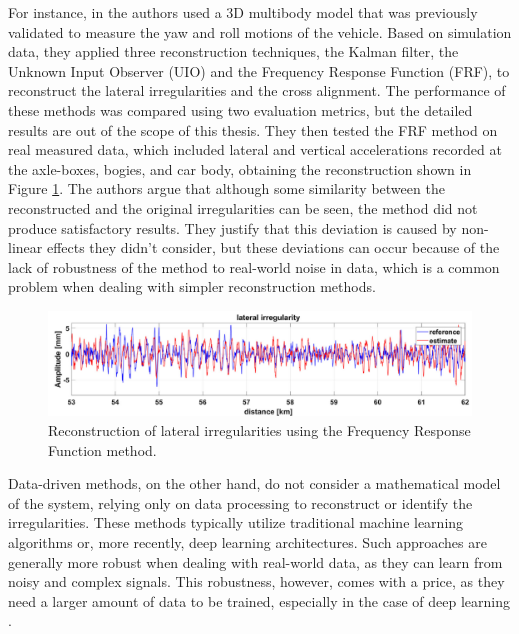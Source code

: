 For instance, in \cite{DEROSA2019606} the authors used a 3D multibody model that was previously validated to measure the yaw and roll motions of the vehicle. Based on simulation data, they applied three reconstruction techniques, the Kalman filter, the Unknown Input Observer (UIO) and the Frequency Response Function (FRF), to reconstruct the lateral irregularities and the cross alignment. The performance of these methods was compared using two evaluation metrics, but the detailed results are out of the scope of this thesis. They then tested the FRF method on real measured data, which included lateral and vertical accelerations recorded at the axle-boxes, bogies, and car body, obtaining the reconstruction shown in Figure \ref{fig:DeRosa_Results}. The authors argue that although some similarity between the reconstructed and the original irregularities can be seen, the method did not produce satisfactory results. They justify that this deviation is caused by non-linear effects they didn't consider, but these deviations can occur because of the lack of robustness of the method to real-world noise in data, which is a common problem when dealing with simpler reconstruction methods.

\begin{figure}[H]
    \centering
    \includegraphics[width=12cm]{Cap2_LitReview/Track_Quality_Accel/DeRosa_Result_Real.png}
    \caption{Reconstruction of lateral irregularities using the Frequency Response Function method. \cite{DEROSA2019606}}
    \label{fig:DeRosa_Results}
\end{figure}

Data-driven methods, on the other hand, do not consider a mathematical model of the system, relying only on data processing to reconstruct or identify the irregularities. These methods typically utilize traditional machine learning algorithms or, more recently, deep learning architectures. Such approaches are generally more robust when dealing with real-world data, as they can learn from noisy and complex signals. This robustness, however, comes with a price, as they need a larger amount of data to be trained, especially in the case of deep learning \cite{Sansinena26032025}. 

